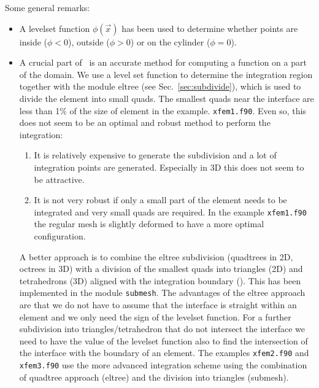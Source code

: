 Some general remarks:
\begin{itemize}
   \item A levelset function $\phi(\vec x)$ \cite{Osher03}
 has been used to determine whether points are
inside ($\phi<0$), outside ($\phi>0$) or on the
cylinder ($\phi=0$).
   \item
 A crucial part of \xfem\ is an accurate method for computing a function on a
part of the domain. We use a level set function to determine the integration
region together with the module eltree (see Sec.~\ref{sec:subdivide}),
which is used to divide the element into small quads.
The smallest quads near the
interface are less than 1\% of the size of element in the example.
\texttt{xfem1.f90}. Even so, this does not seem to
be an optimal and robust method to perform the integration:
\begin{enumerate}
   \item It is relatively expensive to generate the subdivision and a lot of
integration points are generated. Especially in 3D this does not seem to be
attractive.
   \item It is not very robust if only a small part of the element needs to be
integrated and very small quads are required. In the example \texttt{xfem1.f90} the regular mesh is slightly deformed to have a more optimal configuration.
\end{enumerate}
A better approach is to combine the eltree subdivision (quadtrees in 2D,
octrees in 3D) with a
division of the smallest quads into triangles (2D) and tetrahedrons (3D)
aligned with the integration boundary (\cite{Min07}). This has been implemented
in the module \texttt{submesh}.
The advantages of the eltree approach are that we do not have to
assume that the interface is straight within an element and we only need the
sign of the levelset function. For a further subdivision into
triangles/tetrahedron that do not
intersect the interface we need to have the
value of the levelset function also
to find the intersection of the interface with the boundary of an element.
The examples \texttt{xfem2.f90} and \texttt{xfem3.f90}
use the more advanced integration scheme using the combination of
quadtree approach (eltree) and the division into triangles (submesh).

\end{itemize}

